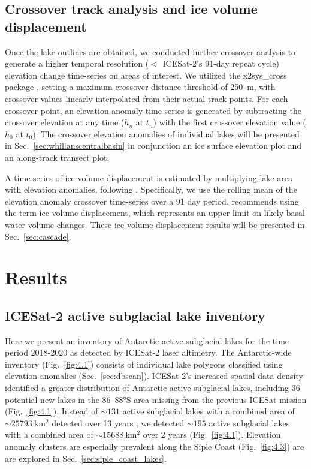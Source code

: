 \subsection{Crossover track analysis and ice volume displacement} \label{sec:crossover_displacement}

Once the lake outlines are obtained, we conducted further crossover analysis to generate a higher temporal resolution ($<$ ICESat-2's 91-day repeat cycle) elevation change time-series on areas of interest.
We utilized the x2sys\_cross package \citep{WesselToolsanalyzingintersecting2010}, setting a maximum crossover distance threshold of \SI{250}{\metre}, with crossover values linearly interpolated from their actual track points.
For each crossover point, an elevation anomaly time series is generated by subtracting the crossover elevation at any time ($h_n$ at $t_n$) with the first crossover elevation value ($h_0$ at $t_0$).
The crossover elevation anomalies of individual lakes will be presented in Sec.~\ref{sec:whillanscentralbasin} in conjunction an ice surface elevation plot and an along-track transect plot.

A time-series of ice volume displacement is estimated by multiplying lake area with elevation anomalies, following \citet{SiegfriedEpisodicicevelocity2016,KimActivesubglaciallakes2016}.
Specifically, we use the rolling mean of the elevation anomaly crossover time-series over a 91 day period. %
\citet{SiegfriedEpisodicicevelocity2016} recommends using the term ice volume displacement, which represents an upper limit on likely basal water volume changes.
These ice volume displacement results will be presented in Sec.~\ref{sec:cascade}.

\clearpage
\section{Results}

\subsection{ICESat-2 active subglacial lake inventory}

Here we present an inventory of Antarctic active subglacial lakes for the time period 2018-2020 as detected by ICESat-2 laser altimetry.
The Antarctic-wide inventory (Fig.~\ref{fig:4.1}) consists of individual lake polygons classified using elevation anomalies (Sec.~\ref{sec:dbscan}).
ICESat-2's increased spatial data density identified a greater distribution of Antarctic active subglacial lakes, including 36 potential new lakes in the 86–88°S area missing from the previous ICESat mission (Fig.~\ref{fig:4.1}).
Instead of $\sim131$ active subglacial lakes with a combined area of $\sim\SI{25793}{\kilo\metre\squared}$ detected over 13 years \citep{SiegfriedThirteenyearssubglacial2018}, we detected $\sim195$ active subglacial lakes with a combined area of $\sim\SI{15688}{\kilo\metre\squared}$ over 2 years (Fig.~\ref{fig:4.1}). %
Elevation anomaly clusters are especially prevalent along the Siple Coast (Fig.~\ref{fig:4.3}) are are explored in Sec.~\ref{sec:siple_coast_lakes}.

